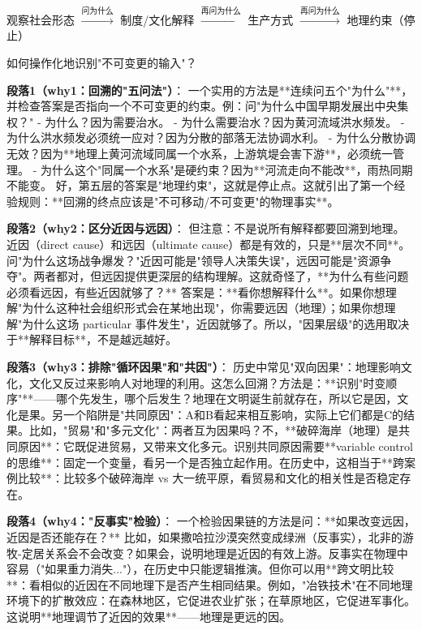 \documentclass[openany, a4paper, 12pt]{book}
\newenvironment{logicmap}{
	\begin{tcolorbox}[
		colback=blue!5!white,      %
		colframe=blue!50!black,    %
		title=\textbf{逻辑地图 (Logic Map)}, %
		fonttitle=\bfseries,
		sharp corners=south,       %
		boxrule=0.5mm
		]
	\centering
	}{
	\end{tcolorbox}
}
\begin{document}
	\begin{logicmap}
		观察社会形态 $\xrightarrow{\text{问为什么}}$ 制度/文化解释 $\xrightarrow{\text{再问为什么}}$ 生产方式 $\xrightarrow{\text{再问为什么}}$ 地理约束（停止）
	\end{logicmap}
	
	\begin{questionbox}
		如何操作化地识别"不可变更的输入"？
	\end{questionbox}
	
	\textbf{段落1（why1：回溯的"五问法"）}：  
	一个实用的方法是**连续问五个"为什么"**，并检查答案是否指向一个不可变更的约束。例：问"为什么中国早期发展出中央集权？"  
	- 为什么？因为需要治水。  
	- 为什么需要治水？因为黄河流域洪水频发。  
	- 为什么洪水频发必须统一应对？因为分散的部落无法协调水利。  
	- 为什么分散协调无效？因为**地理上黄河流域同属一个水系，上游筑堤会害下游**，必须统一管理。  
	- 为什么这个"同属一个水系"是硬约束？因为**河流走向不能改**，雨热同期不能变。  
	好，第五层的答案是"地理约束"，这就是停止点。这就引出了第一个经验规则：**回溯的终点应该是"不可移动/不可变更"的物理事实**。
	
	\textbf{段落2（why2：区分近因与远因）}：  
	但注意：不是说所有解释都要回溯到地理。近因（direct cause）和远因（ultimate cause）都是有效的，只是**层次不同**。问"为什么这场战争爆发？"近因可能是"领导人决策失误"，远因可能是"资源争夺"。两者都对，但远因提供更深层的结构理解。这就奇怪了，**为什么有些问题必须看远因，有些近因就够了？** 答案是：**看你想解释什么**。如果你想理解"为什么这种社会组织形式会在某地出现"，你需要远因（地理）；如果你想理解"为什么这场 particular 事件发生"，近因就够了。所以，"因果层级"的选用取决于**解释目标**，不是越远越好。
	
	\textbf{段落3（why3：排除"循环因果"和"共因"）}：  
	历史中常见"双向因果"：地理影响文化，文化又反过来影响人对地理的利用。这怎么回溯？方法是：**识别"时变顺序"**——哪个先发生，哪个后发生？地理在文明诞生前就存在，所以它是因，文化是果。另一个陷阱是"共同原因"：A和B看起来相互影响，实际上它们都是C的结果。比如，"贸易"和"多元文化"：两者互为因果吗？不，**破碎海岸（地理）是共同原因**：它既促进贸易，又带来文化多元。识别共同原因需要**variable control 的思维**：固定一个变量，看另一个是否独立起作用。在历史中，这相当于**跨案例比较**：比较多个破碎海岸 vs 大一统平原，看贸易和文化的相关性是否稳定存在。
	
	\textbf{段落4（why4："反事实"检验）}：  
	一个检验因果链的方法是问：**如果改变远因，近因是否还能存在？** 比如，如果撒哈拉沙漠突然变成绿洲（反事实），北非的游牧-定居关系会不会改变？如果会，说明地理是近因的有效上游。反事实在物理中容易（"如果重力消失..."），在历史中只能逻辑推演。但你可以用**跨文明比较**：看相似的近因在不同地理下是否产生相同结果。例如，"冶铁技术"在不同地理环境下的扩散效应：在森林地区，它促进农业扩张；在草原地区，它促进军事化。这说明**地理调节了近因的效果**——地理是更远的因。
	
\end{document}

